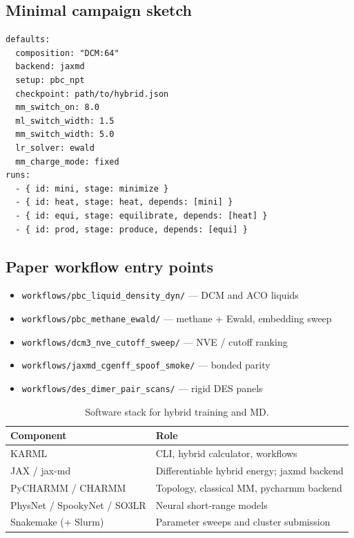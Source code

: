 \documentclass[journal=jctc,manuscript=article]{achemso}
\begin{document}
\subsection{Minimal campaign sketch}

\begin{verbatim}
defaults:
  composition: "DCM:64"
  backend: jaxmd
  setup: pbc_npt
  checkpoint: path/to/hybrid.json
  mm_switch_on: 8.0
  ml_switch_width: 1.5
  mm_switch_width: 5.0
  lr_solver: ewald
  mm_charge_mode: fixed
runs:
  - { id: mini, stage: minimize }
  - { id: heat, stage: heat, depends: [mini] }
  - { id: equi, stage: equilibrate, depends: [heat] }
  - { id: prod, stage: produce, depends: [equi] }
\end{verbatim}

\subsection{Paper workflow entry points}

\begin{itemize}
\item \texttt{workflows/pbc\_liquid\_density\_dyn/} --- DCM and ACO liquids
\item \texttt{workflows/pbc\_methane\_ewald/} --- methane + Ewald, embedding sweep
\item \texttt{workflows/dcm3\_nve\_cutoff\_sweep/} --- NVE / cutoff ranking
\item \texttt{workflows/jaxmd\_cgenff\_spoof\_smoke/} --- bonded parity
\item \texttt{workflows/des\_dimer\_pair\_scans/} --- rigid DES panels
\end{itemize}

\begin{table}[h]
\caption{Software stack for hybrid training and MD.}
\label{tab:soft}
\begin{tabular}{lp{6.2cm}}
\toprule
Component & Role \\
\midrule
KARML\cite{KARML2026} & CLI, hybrid calculator, workflows \\
JAX / jax-md\cite{Schoenholz2019JaxMD} & Differentiable hybrid energy; jaxmd backend \\
PyCHARMM / CHARMM\cite{Brooks2009CHARMM} & Topology, classical MM, pycharmm backend \\
PhysNet / SpookyNet / SO3LR\cite{Unke2019PhysNet,Unke2021SpookyNet,Kabylda2025SO3LR}
  & Neural short-range models \\
Snakemake (+ Slurm) & Parameter sweeps and cluster submission \\
\bottomrule
\end{tabular}
\end{table}
\end{document}
